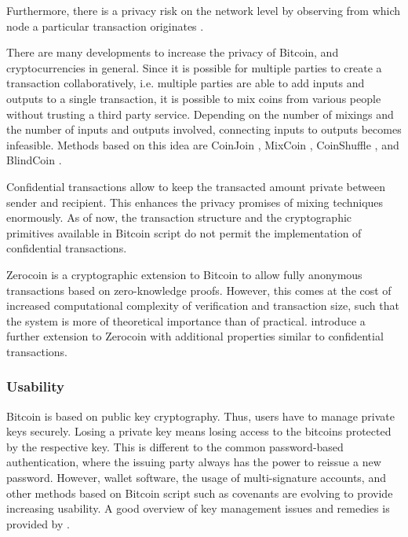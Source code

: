 Furthermore, there is a privacy risk on the network level by observing from which node a particular transaction originates \parencite{Koshy2014,Biryukov:2014:DCB:2660267.2660379}.

There are many developments to increase the privacy of Bitcoin, and cryptocurrencies in general. Since it is possible for multiple parties to create a transaction collaboratively, i.e. multiple parties are able to add inputs and outputs to a single transaction, it is possible to mix coins from various people without trusting a third party service. Depending on the number of mixings and the number of inputs and outputs involved, connecting inputs to outputs becomes infeasible. Methods based on this idea are CoinJoin \parencite{maxwellcoinjoin,Meiklejohn2015}, MixCoin \parencite{Bonneau2014}, CoinShuffle \parencite{Ruffing2014}, and BlindCoin \parencite{Valenta2015}. 

Confidential transactions \parencite{nullc2015} allow to keep the transacted amount private between sender and recipient. This enhances the privacy promises of mixing techniques enormously. As of now, the transaction structure and the cryptographic primitives available in Bitcoin script do not permit the implementation of confidential transactions.

Zerocoin \parencite{6547123} is a cryptographic extension to Bitcoin to allow fully anonymous transactions based on zero-knowledge proofs. However, this comes at the cost of increased computational complexity of verification and transaction size, such that the system is more of theoretical importance than of practical. \cite{Androulaki2014} introduce a further extension to Zerocoin with additional properties similar to confidential transactions.

\subsubsection{Usability}

Bitcoin is based on public key cryptography. Thus, users have to manage private keys securely. Losing a private key means losing access to the bitcoins protected by the respective key. This is different to the common password-based authentication, where the issuing party always has the power to reissue a new password. 
However, wallet software, the usage of multi-signature accounts, and other methods based on Bitcoin script such as covenants \parencite{moserbitcoin} are evolving to provide increasing usability. 
A good overview of key management issues and remedies is provided by \cite{eskandari2015first}.

